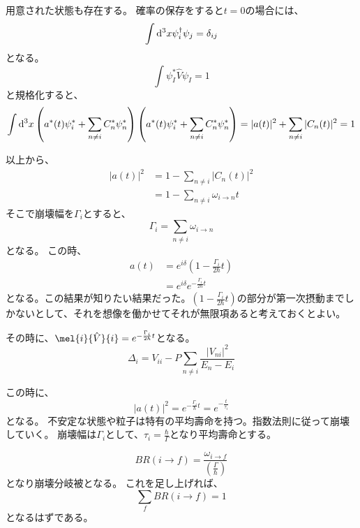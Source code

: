\documentclass[titlepage]{ltjsarticle}
\begin{document}
用意された状態も存在する。
確率の保存をすると\(t=0\)の場合には、
\begin{equation}
  \int \odif[order=3]{x} \psi_i^\dagger \psi_j = \delta_{ij}
\end{equation}
となる。
\begin{equation}
  \int \psi_I^\ast \hat{V} \psi_I =1 
\end{equation}
と規格化すると、
\begin{equation}
  \int \odif[order=3]{x} \left( a^\ast (t) \psi^\ast _i + \sum_{n\ne i} C_n^\ast \psi^\ast_n  \right)\left( a^\ast (t) \psi^\ast _i + \sum_{n\ne i} C_n^\ast \psi^\ast_n  \right) = |a(t)|^2 + \sum_{n\ne i} |C_n(t)|^2 = 1
\end{equation}

以上から、
\begin{align}
  |a(t)|^2 &  = 1 - \sum_{n\ne i} |C_n(t)|^2\\
  & = 1 - \sum_{n\ne i} \omega_{i\to n} t 
\end{align}
そこで崩壊幅を\(\Gamma_i\)とすると、
\begin{equation}
  \Gamma_i = \sum_{n\ne i} \omega_{i\to n}
\end{equation}
となる。
この時、
\begin{align}
  a(t) & = e^{i \delta} \left( 1 - \frac{\Gamma_i}{2 \hbar}t \right) \\
  & = e^{i \delta} e^{-\frac{\Gamma_i}{2 \hbar}t}
\end{align}
となる。この結果が知りたい結果だった。\(\left( 1 - \frac{\Gamma_i}{2 \hbar}t \right)\)の部分が第一次摂動までしかないとして、それを想像を働かせてそれが無限項あると考えておくとよい。

その時に、\(\mel{i}{\hat{V}}{i}=e^{-\frac{\Gamma_i}{2 \hbar}t}\)となる。
\begin{equation}
  \Delta_i = V_{ii} - P \sum_{n\ne i} \frac{|V_{ni}|^2}{E_n-E_i}
\end{equation}

この時に、
\begin{equation}
  |a(t)|^2 = e^{-\frac{\Gamma_i}{\hbar}t} = e^{-\frac{t}{\tau_i}}
\end{equation}
となる。
不安定な状態や粒子は特有の平均壽命を持つ。指数法則に従って崩壊していく。
崩壊幅は\(\Gamma_i\)として、\(\tau_i=\frac{\hbar}{\Gamma}\)となり平均壽命とする。

\begin{equation}
  BR(i \to f) = \frac{\omega_{i\to f}}{\left( \frac{\Gamma}{\hbar} \right)}
\end{equation}
となり崩壊分岐被となる。
これを足し上げれば、
\begin{equation}
  \sum_{f} BR(i \to f) = 1
\end{equation}
となるはずである。
\end{document}
